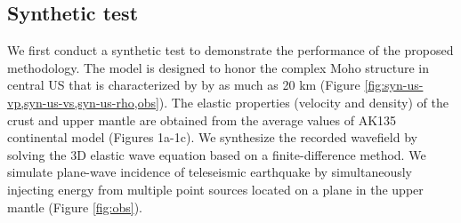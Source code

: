 \subsection*{Synthetic test}
We first conduct a synthetic test to demonstrate the performance of the proposed methodology. The model is designed to honor  the complex Moho structure in central US \cite[]{schmandt2015distinct} that is characterized by  by as much as 20 km (Figure \ref{fig:syn-us-vp,syn-us-vs,syn-us-rho,obs}).  The elastic properties (velocity and density) of the crust and upper mantle are obtained from the average values of AK135 continental model\cite[]{kennett1995constraints} (Figures 1a-1c).  We synthesize the recorded wavefield by solving the 3D elastic wave equation based on a finite-difference method. We simulate plane-wave incidence of teleseismic earthquake by simultaneously injecting energy from multiple point sources located on a plane in the upper mantle (Figure \ref{fig:obs}). %

